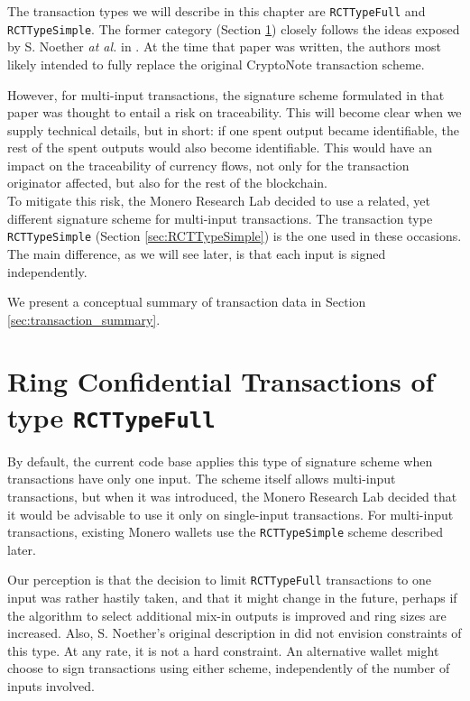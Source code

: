 The transaction types we will describe in this chapter are {\tt RCTTypeFull} and {\tt RCTTypeSimple}. The former category (Section \ref{sec:RCTTypeFull}) closely follows the ideas exposed by S. Noether {\em at al.} in \cite{ledger34}. At the time that paper was written, the authors most likely intended to fully replace the original CryptoNote transaction scheme.

However, for multi-input transactions, the signature scheme formulated in that paper was thought to entail a risk on traceability. This will become clear when we supply technical details, but in short: if one spent output became identifiable, the rest of the spent outputs would also become identifiable. This would have an impact on the traceability of currency flows, not only for the transaction originator affected, but also for the rest of the blockchain.
\\

To mitigate this risk, the Monero Research Lab decided to use a related, yet different signature scheme for multi-input transactions. The transaction type {\tt RCTTypeSimple} (Section \ref{sec:RCTTypeSimple}) is the one used in these occasions. The main difference, as we will see later, is that each input is signed independently.

We present a conceptual summary of transaction data in Section \ref{sec:transaction_summary}.


\section{Ring Confidential Transactions of type {\tt RCTTypeFull}}
\label{sec:RCTTypeFull}

By default, the current code base applies this type of signature scheme when transactions have only one input. The scheme itself allows multi-input transactions, but when it was introduced, the Monero Research Lab decided that it would be advisable to use it only on single-input transactions. For multi-input transactions, existing Monero wallets use the {\tt RCTTypeSimple} scheme described later.

Our perception is that the decision to limit {\tt RCTTypeFull} transactions to one input was rather hastily taken, and that it might change in the future, perhaps if the algorithm to select additional mix-in outputs is improved and ring sizes are increased. Also, S. Noether’s original description in \cite{ledger34} did not envision constraints of this type. At any rate, it is not a hard constraint. An alternative wallet might choose to sign transactions using either scheme, independently of the number of inputs involved.

